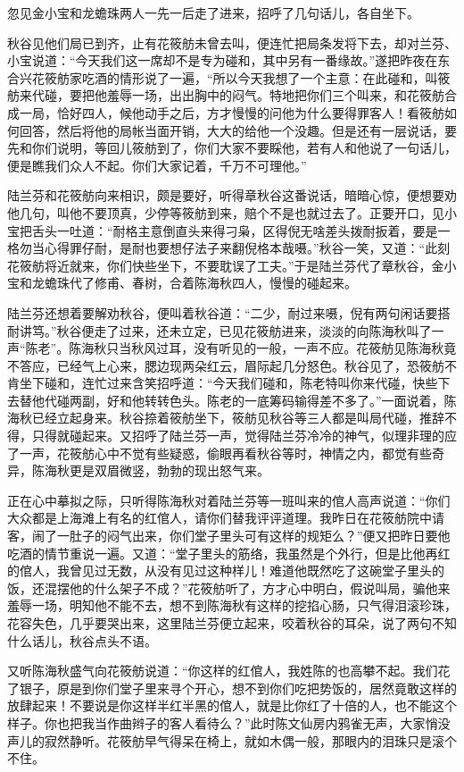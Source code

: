\documentclass[12pt,UTF8]{ctexbook}
\begin{document}
{{{忽见金小宝和龙蟾珠两人一先一后走了进来，招呼了几句话儿，各自坐下。

秋谷见他们局已到齐，止有花筱舫未曾去叫，便连忙把局条发将下去，却对兰芬、小宝说道：“今天我们这一席却不是专为碰和，其中另有一番缘故。”遂把昨夜在东合兴花筱舫家吃酒的情形说了一遍，“所以今天我想了一个主意：在此碰和，叫筱舫来代碰，要把他羞辱一场，出出胸中的闷气。特地把你们三个叫来，和花筱舫合成一局，恰好四人，候他动手之后，方才慢慢的问他为什么要得罪客人！看筱舫如何回答，然后将他的局帐当面开销，大大的给他一个没趣。但是还有一层说话，要先和你们说明，等回儿筱舫到了，你们大家不要睬他，若有人和他说了一句话儿，便是瞧我们众人不起。你们大家记着，千万不可理他。”

陆兰芬和花筱舫向来相识，颇是要好，听得章秋谷这番说话，暗暗心惊，便想要劝他几句，叫他不要顶真，少停等筱舫到来，赔个不是也就过去了。正要开口，见小宝把舌头一吐道：“耐格主意倒直头来得刁枭，区得倪无啥差头拨耐扳着，要是一格勿当心得罪仔耐，是耐也要想仔法子来翻倪格本哉嗫。”秋谷一笑，又道：“此刻花筱舫将近就来，你们快些坐下，不要耽误了工夫。”于是陆兰芬代了章秋谷，金小宝和龙蟾珠代了修甫、春树，合着陈海秋四人，慢慢的碰起来。

陆兰芬还想着要解劝秋谷，便叫着秋谷道：“二少，耐过来嗫，倪有两句闲话要搭耐讲笃。”秋谷便走了过来，还未立定，已见花筱舫进来，淡淡的向陈海秋叫了一声“陈老”。陈海秋只当秋风过耳，没有听见的一般，一声不应。花筱舫见陈海秋竟不答应，已经气上心来，腮边现两朵红云，眉际起几分怒色。秋谷见了，恐筱舫不肯坐下碰和，连忙过来含笑招呼道：“今天我们碰和，陈老特叫你来代碰，快些下去替他代碰两副，好和他转转色头。陈老的一底筹码输得差不多了。”一面说着，陈海秋已经立起身来。秋谷捺着筱舫坐下，筱舫见秋谷等三人都是叫局代碰，推辞不得，只得就碰起来。又招呼了陆兰芬一声，觉得陆兰芬冷冷的神气，似理非理的应了一声，花筱舫心中不觉有些疑惑，偷眼再看秋谷等时，神情之内，都觉有些奇异，陈海秋更是双眉微竖，勃勃的现出怒气来。

正在心中摹拟之际，只听得陈海秋对着陆兰芬等一班叫来的倌人高声说道：“你们大众都是上海滩上有名的红倌人，请你们替我评评道理。我昨日在花筱舫院中请客，闹了一肚子的闷气出来，你们堂子里头可有这样的规矩么？”便又把昨日要他吃酒的情节重说一遍。又道：“堂子里头的筋络，我虽然是个外行，但是比他再红的倌人，我曾见过无数，从没有见过这种样儿！难道他既然吃了这碗堂子里头的饭，还混摆他的什么架子不成？”花筱舫听了，方才心中明白，假说叫局，骗他来羞辱一场，明知他不能不去，想不到陈海秋有这样的挖掐心肠，只气得泪滚珍珠，花容失色，几乎要哭出来，这里陆兰芬便立起来，咬着秋谷的耳朵，说了两句不知什么话儿，秋谷点头不语。

又听陈海秋盛气向花筱舫说道：“你这样的红倌人，我姓陈的也高攀不起。我们花了银子，原是到你们堂子里来寻个开心，想不到你们吃把势饭的，居然竟敢这样的放肆起来！不要说是你这样半红半黑的倌人，就是比你红了十倍的人，也不能这个样子。你也把我当作曲辫子的客人看待么？”此时陈文仙房内鸦雀无声，大家悄没声儿的寂然静听。花筱舫早气得呆在椅上，就如木偶一般，那眼内的泪珠只是滚个不住。

}}}
\end{document}
